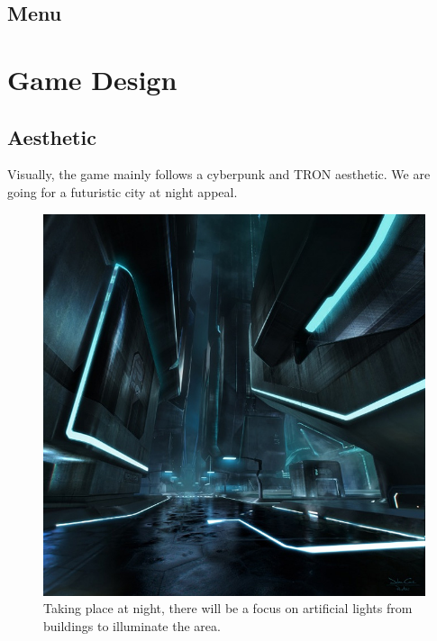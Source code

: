 \documentclass{article}
\theoremstyle{definition}
\begin{document}
\subsection{Menu}

\section{Game Design}

\subsection{Aesthetic}

Visually, the game mainly follows a cyberpunk and TRON aesthetic. We are going
for a futuristic city at night appeal.

\begin{figure}[htpb]
  \centering
  \includegraphics[width=0.8\linewidth]{theme01.jpg}
  \caption{Taking place at night, there will be a focus on artificial lights
  from buildings to illuminate the area.}
\label{fig:theme01}
\end{figure}
\end{document}
